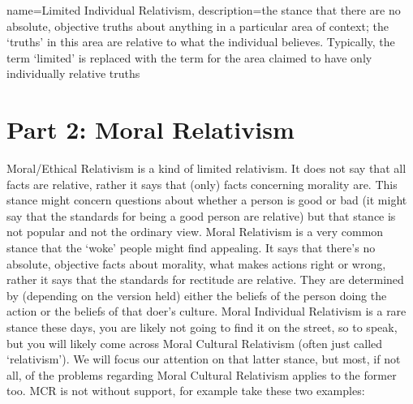 {
  name=Limited Individual Relativism,
  description={the stance that there are no absolute, objective truths about anything in a particular area of context; the `truths' in this area are relative to what the individual believes. Typically, the term `limited' is replaced with the term for the area claimed to have only individually relative truths}
}


\begin{center}
\end{center}




\chapter{Part 2: Moral Relativism}

Moral/Ethical Relativism is a kind of limited relativism. It does not say that all facts are relative, rather it says that (only) facts concerning morality are. This stance might concern questions about whether a person is good or bad (it might say that the standards for being a good person are relative) but that stance is not popular and not the ordinary view. Moral Relativism is a very common stance that the `woke' people might find appealing. It says that there's no absolute, objective facts about morality, what makes actions right or wrong, rather it says that the standards for rectitude are relative. They are determined by (depending on the version held) either the beliefs of the person doing the action or the beliefs of that doer's culture. Moral Individual Relativism is a rare stance these days, you are likely not going to find it on the street, so to speak, but you will likely come across  \gls{Moral Cultural Relativism} (often just called `relativism'). We will focus our attention on that latter stance, but most, if not all, of the problems regarding Moral Cultural Relativism applies to the former too. MCR is not without support, for example take these two examples:

